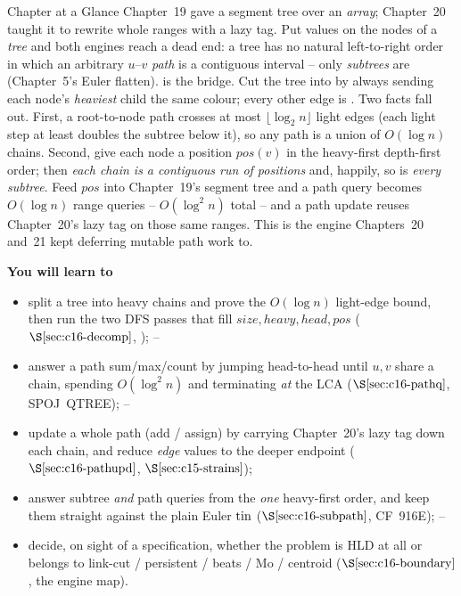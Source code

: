 \begin{chaptertheorybox}{Chapter at a Glance}
Chapter~19 gave a segment tree over an \emph{array}; Chapter~20 taught it to
rewrite whole ranges with a lazy tag.  Put values on the nodes of a \emph{tree}
and both engines reach a dead end: a tree has no natural left-to-right order in
which an arbitrary \(u\)--\(v\) \emph{path} is a contiguous interval -- only
\emph{subtrees} are (Chapter~5's Euler flatten).   is the bridge.  Cut the tree into  by always sending
each node's \emph{heaviest} child the same colour; every other edge is
.  Two facts fall out.  First, a root-to-node path crosses at most
\(\lfloor\log_2 n\rfloor\) light edges (each light step at least doubles the
subtree below it), so any path is a union of \(O(\log n)\) chains.  Second, give
each node a position \(\mathit{pos}(v)\) in the heavy-first depth-first order; then
\emph{each chain is a contiguous run of positions} and, happily, so is
\emph{every subtree}.  Feed \(\mathit{pos}\) into Chapter~19's segment tree and a path
query becomes \(O(\log n)\) range queries -- \(O(\log^2 n)\) total -- and a path
update reuses Chapter~20's lazy tag on those same ranges.  This is the engine
Chapters~20 and~21 kept deferring mutable path work to.

\textbf{You will learn to}
\begin{itemize}[nosep]
  \item split a tree into heavy chains and prove the \(O(\log n)\) light-edge
        bound, then run the two DFS passes that fill \(\mathit{size},\mathit{heavy},
        \mathit{head},\mathit{pos}\) (\(\secref{c16-decomp}\), ); \hfill{}--
  \item answer a path sum/max/count by jumping head-to-head until \(u,v\) share a
        chain, spending \(O(\log^2 n)\) and terminating \emph{at} the LCA
        (\(\secref{c16-pathq}\), SPOJ~QTREE); \hfill{}--
  \item update a whole path (add / assign) by carrying Chapter~20's lazy tag down
        each chain, and reduce \emph{edge} values to the deeper endpoint
        (\(\secref{c16-pathupd}\), \(\secref{c15-strains}\)); \hfill{}
  \item answer subtree \emph{and} path queries from the \emph{one} heavy-first
        order, and keep them straight against the plain Euler \(\operatorname{tin}\)
        (\(\secref{c16-subpath}\), CF~916E); \hfill{}--
  \item decide, on sight of a specification, whether the problem is HLD at all or
        belongs to link-cut / persistent / beats / Mo / centroid
        (\(\secref{c16-boundary}\), the engine map). \hfill{}
\end{itemize}


\end{chaptertheorybox}
